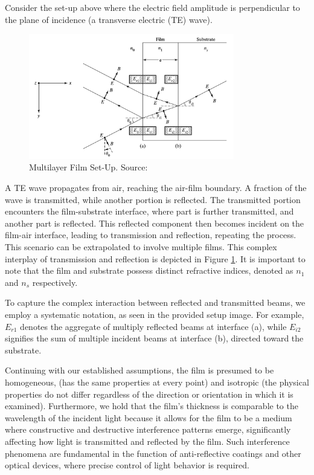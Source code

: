Consider the set-up above where the electric field amplitude is perpendicular to the plane of incidence (a transverse electric (TE) wave).
\begin{figure}[ht!]
  \centering
  \includegraphics[width=0.8\textwidth]{Chapters/Figures/Chapter 2 Figures/Multilayer Film Set-Up.png}
  \caption[Multilayer Film Set-Up]{Multilayer Film Set-Up. Source: \cite{pedrotti_introduction_2007}}
  \label{Multilayer Film Set-Up}
\end{figure}

A TE wave propagates from air, reaching the air-film boundary. A fraction of the wave is transmitted, while another portion is reflected. The transmitted portion encounters the film-substrate interface, where part is further transmitted, and another part is reflected. This reflected component then becomes incident on the film-air interface, leading to transmission and reflection, repeating the process. This scenario can be extrapolated to involve multiple films. This complex interplay of transmission and reflection is depicted in Figure \ref{Multilayer Film Set-Up}. It is important to note that the film and substrate possess distinct refractive indices, denoted as $n_1$ and $n_s$ respectively.

To capture the complex interaction between reflected and transmitted beams, we employ a systematic notation, as seen in the provided setup image. For example, $E_{r1}$ denotes the aggregate of multiply reflected beams at interface (a), while $E_{i2}$ signifies the sum of multiple incident beams at interface (b), directed toward the substrate. %

Continuing with our established assumptions, the film is presumed to be homogeneous, (has the same properties at every point) and isotropic (the physical properties do not differ regardless of the direction or orientation in which it is examined). Furthermore, we hold that the film's thickness is comparable to the wavelength of the incident light because it allows for the film to be a medium where constructive and destructive interference patterns emerge, significantly affecting how light is transmitted and reflected by the film. Such interference phenomena are fundamental in the function of anti-reflective coatings and other optical devices, where precise control of light behavior is required. %

